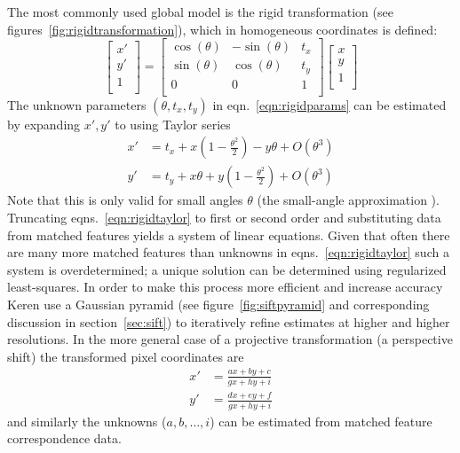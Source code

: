 The most commonly used global model is the rigid transformation (see figures~\ref{fig:rigidtransformation}), which in homogeneous coordinates is defined:
\begin{equation}
	\begin{bmatrix}
		x' \\
		y' \\
		1  \\
	\end{bmatrix} =
	\begin{bmatrix}
		\cos(\theta) & -\sin(\theta) & t_x \\
		\sin(\theta) & \cos(\theta)  & t_y \\
		0            & 0             & 1   \\
	\end{bmatrix}
	\begin{bmatrix}
		x \\
		y \\
		1 \\
	\end{bmatrix}
	\label{eqn:rigidparams}
\end{equation}
The unknown parameters \((\theta, t_x, t_y)\) in eqn.~\eqref{eqn:rigidparams} can be estimated by expanding \(x', y'\) to using Taylor series
\begin{equation}
	\begin{split}
		x' &= t_x + x\left( 1 - \frac{\theta^2}{2} \right) - y\theta  + O(\theta^3) \\
		y' &= t_y + x \theta  + y\left( 1 - \frac{\theta^2}{2} \right) + O(\theta^3)
	\end{split}
	\label{eqn:rigidtaylor}
\end{equation}
Note that this is only valid for small angles \(\theta\) (the small-angle approximation \cite{keren1988}).
%
Truncating eqns.~\eqref{eqn:rigidtaylor} to first or second order and substituting data from matched features yields a system of linear equations.
%
Given that often there are many more matched features than unknowns in eqns.~\eqref{eqn:rigidtaylor} such a system is overdetermined; a unique solution can be determined using regularized least-squares.
%
In order to make this process more efficient and increase accuracy Keren \etal \cite{keren1988} use a Gaussian pyramid (see figure~\ref{fig:siftpyramid} and corresponding discussion in section~\ref{sec:sift}) to iteratively refine estimates at higher and higher resolutions.
%
In the more general case of a projective transformation (a perspective shift) the transformed pixel coordinates are
\begin{equation}
	\begin{split}
		x' & = \frac{ax+by+c}{gx+hy+i} \\
		y' & = \frac{dx+ey+f}{gx+hy+i}
		\label{eqn:projectivetf}
	\end{split}
\end{equation}
and similarly the unknowns (\(a,b,\dots, i\)) can be estimated from matched feature correspondence data.


